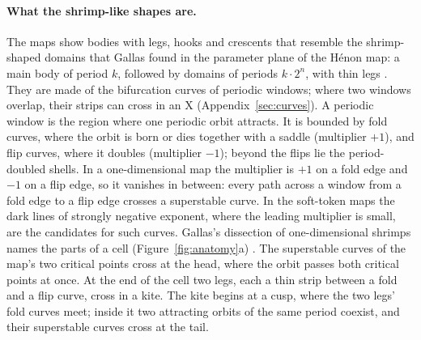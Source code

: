 \documentclass[11pt,letterpaper]{article}
\begin{document}
\paragraph{What the shrimp-like shapes are.} The maps show bodies with legs, hooks and crescents that resemble the
shrimp-shaped domains that Gallas found in the parameter plane of the H\'enon map: a main body of period $k$, followed
by domains of periods $k\cdot2^n$, with thin legs \cite{gallas1993structure}. They are made of the bifurcation curves
of periodic windows; where two windows overlap, their strips can cross in an X (Appendix~\ref{sec:curves}). A periodic
window is the region where one periodic orbit attracts. It is bounded by fold curves, where the orbit is born or dies
together with a saddle (multiplier $+1$), and flip curves, where it doubles (multiplier $-1$); beyond the flips lie
the period-doubled shells. In a one-dimensional map the multiplier is $+1$ on a fold edge and $-1$ on a flip edge, so it vanishes
in between: every path across a window from a fold edge to a flip edge crosses a superstable curve. In the soft-token
maps the dark lines of strongly negative exponent, where the leading multiplier is small, are the candidates for such
curves.
Gallas's dissection of one-dimensional shrimps names the parts of a cell (Figure~\ref{fig:anatomy}a)
\cite{gallas1994dissecting}. The superstable curves of the map's two critical points cross at the head, where the
orbit passes both critical points at once. At the end of the cell two legs, each a thin strip between a fold and a
flip curve, cross in a kite. The kite begins at a cusp, where the two legs' fold curves meet; inside it two attracting
orbits of the same period coexist, and their superstable curves cross at the tail.
\end{document}
